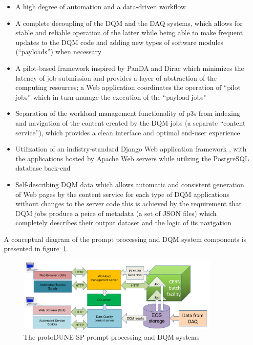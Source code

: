 \documentclass{webofc}
\begin{document}
\begin{itemize}

\item A high degree of automation and a data-driven workflow

\item A complete decoupling of the DQM and the DAQ systems, which allows
for stable and reliable operation of the latter while being able to make frequent updates to the
DQM code and adding new types of software modules (``payloads'') when necessary

\item A pilot-based framework inspired by PanDA and Dirac \cite{panda,dirac}
which minimizes the latency of job submission and provides a layer of abstraction
of the computing resources; a Web application coordinates the operation of ``pilot jobs''
which in turn manage the execution of the ``payload jobs''

\item Separation of the workload management functionality  of p3s  from
indexing and navigation of the content created by the DQM  jobs (a separate ``content service''),
which provides a clean interface and optimal end-user experience

\item Utilization of an indistry-standard Django Web application framework  \cite{django},
with the applications hosted by Apache Web servers while utilzing the PostgreSQL database
back-end

\item Self-describing DQM data which allows automatic and consistent generation of Web pages
by the content service for each type of DQM applications without changes to the server code
 this is achieved by the requirement that DQM jobs produce a peice of metadata (a set of JSON files)
which completely describes their output dataset and the logic of its navigation

\end{itemize}
\noindent
A conceptual diagram of the prompt processing and DQM system components
is presented in figure~\ref{dqm-diagram}.

\begin{figure}[h]
\centering
\includegraphics[width=0.9\textwidth,clip]{figures/dqm-p3s-diagram.png}
\caption{The protoDUNE-SP prompt processing and DQM systems}
\label{dqm-diagram}
\end{figure}
\end{document}
